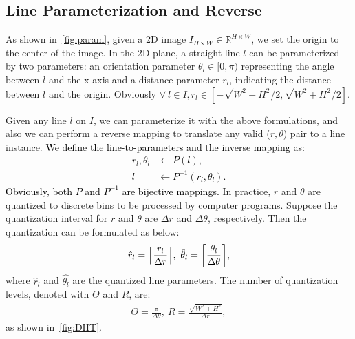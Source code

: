 \documentclass[10pt,journal,cspaper,compsoc]{IEEEtran}
\DeclarePairedDelimiter\ceil{\lceil}{\rceil}
\newcommand{\revise}[1]{{\textcolor{black}{#1}}}
\newcommand{\CheckRmv}[1]{}
\newcommand{\CheckRmv}[1]{#1}
\begin{document}
\subsection{Line Parameterization and Reverse} \label{sec:preliminary}
\CheckRmv{
\begin{figure}[!htb]
  \centering
    \begin{overpic}[height=.6\linewidth]{figures/line_param.pdf}
      \put(29, 29){$r_l$}
      \put(57, 55){$\theta_l$}
      \put(100, 50){$x$}
      \put(52, 100){$y$}
    \end{overpic}
  \caption{A line can be parameterized by bias $r_l$ and slope $\theta_l$.
  }\label{fig:param}
\end{figure}
}
As shown in~\cref{fig:param},
given a 2D image \revise{$I_{H\times W}\in\mathbb{R}^{H\times W}$},
we set the origin to the center of the image.
In the 2D plane, a straight line $l$ can be parameterized by two parameters: an orientation parameter $\theta_l\in [0, \pi)$ representing the angle between $l$ and the x-axis and a distance parameter $r_l$, indicating the distance between $l$ and the origin.
Obviously $\forall \ l \in I, r_l \in [-\sqrt{W^2+H^2}/2, \sqrt{W^2+H^2}/2]$.

Given any line $l$ on $I$, we can parameterize it with the above formulations,
and also we can perform a reverse mapping to translate any valid
($r, \theta$) pair to a line instance.
\revise{We define the line-to-parameters and the inverse mapping
as:
\begin{equation}
\begin{split}
  r_l, \theta_l &\leftarrow P(l), \\
  l             &\leftarrow P^{-1}(r_l, \theta_l).
  \label{eq:parameterize}
\end{split}
\end{equation}
Obviously, both $P$ and $P^{-1}$ are bijective mappings.}
In practice, $r$ and $\theta$ are quantized to discrete bins to be processed by computer programs.
Suppose the quantization interval for $r$ and $\theta$ are $\Delta r$ and $\Delta \theta$, respectively.
Then the quantization can be formulated as below:
\begin{equation}
  \begin{split}
    \hat{r}_l = \ceil*{\frac{r_l}{\Delta r}}, \
    \hat{\theta}_l = \ceil*{\frac{\theta_l}{\Delta \theta}},
  \end{split}\label{eq:quantization}
\end{equation}
where $\hat{r}_l$ and $\hat{\theta_l}$ are the quantized line parameters.
The number of quantization levels, denoted with $\Theta$ and $R$, are:
\begin{equation}
  \begin{split}
    \Theta = \frac{\pi}{\Delta \theta}, \
    R = \frac{\sqrt{W^2+H^2}}{\Delta r},
  \end{split}\label{eq:grid-size}
\end{equation}
as shown in~\cref{fig:DHT}.
\end{document}

